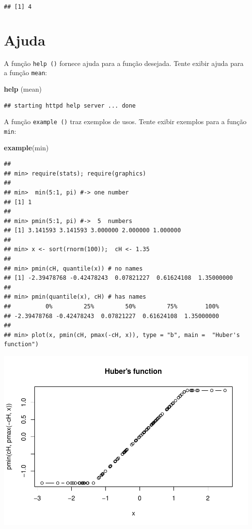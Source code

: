 \documentclass[
]{book}
\newenvironment{Shaded}{\begin{snugshade}}{\end{snugshade}}
\newcommand{\KeywordTok}[1]{\textcolor[rgb]{0.13,0.29,0.53}{\textbf{#1}}}
\newcommand{\NormalTok}[1]{#1}
\begin{document}
\begin{verbatim}
## [1] 4
\end{verbatim}

\hypertarget{ajuda}{%
\section{Ajuda}\label{ajuda}}

A função \texttt{help\ ()} fornece ajuda para a função desejada. Tente exibir ajuda para a função \texttt{mean}:

\begin{Shaded}
\begin{Highlighting}[]
\KeywordTok{help}\NormalTok{ (mean)}
\end{Highlighting}
\end{Shaded}

\begin{verbatim}
## starting httpd help server ... done
\end{verbatim}

A função \texttt{example\ ()} traz exemplos de usos. Tente exibir exemplos para a função \texttt{min}:

\begin{Shaded}
\begin{Highlighting}[]
\KeywordTok{example}\NormalTok{(min)}
\end{Highlighting}
\end{Shaded}

\begin{verbatim}
## 
## min> require(stats); require(graphics)
## 
## min>  min(5:1, pi) #-> one number
## [1] 1
## 
## min> pmin(5:1, pi) #->  5  numbers
## [1] 3.141593 3.141593 3.000000 2.000000 1.000000
## 
## min> x <- sort(rnorm(100));  cH <- 1.35
## 
## min> pmin(cH, quantile(x)) # no names
## [1] -2.39478768 -0.42478243  0.07821227  0.61624108  1.35000000
## 
## min> pmin(quantile(x), cH) # has names
##          0%         25%         50%         75%        100% 
## -2.39478768 -0.42478243  0.07821227  0.61624108  1.35000000 
## 
## min> plot(x, pmin(cH, pmax(-cH, x)), type = "b", main =  "Huber's function")
\end{verbatim}

\includegraphics{TudodoR_files/figure-latex/unnamed-chunk-14-1.pdf}
\end{document}
